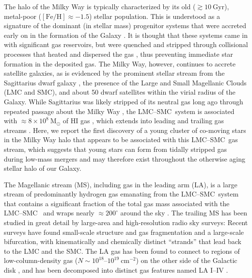 \documentclass[twocolumn]{aastex62}
\newcommand{\msun}{\textrm{M}_\odot}
\newcommand{\feh}{\ensuremath{[\textrm{Fe} / \textrm{H}]}}
\newcommand{\hi}{H{\footnotesize I} }
\newcommand{\lmcsmc}{LMC--SMC}
\begin{document}
The halo of the Milky Way is typically characterized by its old ($\gtrsim 10~\textrm{Gyr}$), metal-poor ($\feh \approx -1.5$) stellar population.
This is understood as a signature of the dominant (in stellar mass) progenitor systems that were accreted early on in the formation of the Galaxy \citep[massive dwarf galaxies][]{Deason:2015, Fiorentino:2015}.
It is thought that these systems came in with significant gas reservoirs, but were quenched and stripped through collisional processes that heated and dispersed the gas \citep[e.g.,][]{Mayer:2006}, thus preventing immediate star formation in the deposited gas.
The Milky Way, however, continues to accrete satellite galaxies, as is evidenced by the prominent stellar stream from the Sagittarius dwarf galaxy \citep{Ibata:1994, Majewski:2003}, the presence of the Large and Small Magellanic Clouds (LMC and SMC), and about 50 dwarf satellites within the virial radius of the Galaxy.
While Sagittarius was likely stripped of its neutral gas long ago through repeated passage about the Milky Way \citep{Burton:1999, Tepper-Garcia:2018}, the \lmcsmc\ system is associated with $\approx 8\times 10^8~\msun$ of \hi gas \citep{Bruns:2005}, which extends into leading and trailing gas streams \citep{Mathewson:1974, Putman:1998, Bruns:2005, Nidever:2010}.
Here, we report the first discovery of a young cluster of co-moving stars in the Milky Way halo that appears to be associated with this \lmcsmc\ gas stream, which suggests that young stars can form from tidally stripped gas during low-mass mergers and may therefore exist throughout the otherwise aging stellar halo of our Galaxy.

The Magellanic stream (MS), including gas in the leading arm (LA), is a large stream of predominantly hydrogen gas emanating from the \lmcsmc\ system that contains a significant fraction of the total gas mass associated with the \lmcsmc\ \citep{Bruns:2005} and wraps nearly $\approx 200^\circ$ around the sky \citep{Mathewson:1974, Putman:1998, Bruns:2005, Nidever:2010}.
The trailing MS has been studied in great detail by large-area and high-resolution radio sky surveys: Recent surveys have found small-scale structure and gas fragmentation \citep[e.g.,][]{Nidever:2008, For:2014} and a large-scale bifurcation, with kinematically \citep{Nidever:2008} and chemically \citep{Fox:2013} distinct ``strands'' that lead back to the LMC and the SMC.
The LA gas has been found to connect to regions of low-column-density gas ($N\sim 10^{18}$--$10^{19}~\textrm{cm}^{-2}$) on the other side of the Galactic disk \citep{Putman:1998, Nidever:2008}, and has been decomposed into distinct gas features named LA I--IV \citep{Bruns:2005, Nidever:2008, Venzmer:2012}.
\end{document}
